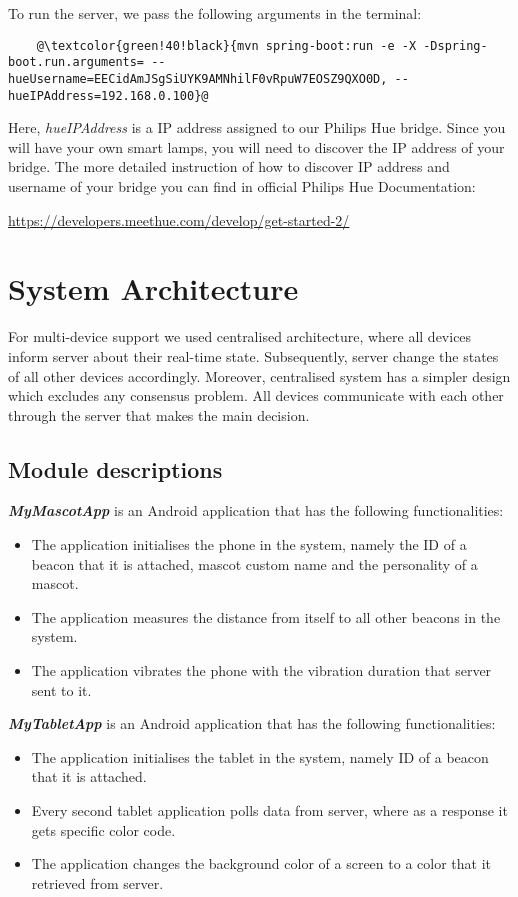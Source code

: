 To run the server, we pass the following arguments in the terminal:
\begin{lstlisting}
    @\textcolor{green!40!black}{mvn spring-boot:run -e -X -Dspring-boot.run.arguments= --hueUsername=EECidAmJSgSiUYK9AMNhilF0vRpuW7EOSZ9QXO0D, --hueIPAddress=192.168.0.100}@
\end{lstlisting}

Here, \emph{hueIPAddress} is a IP address assigned to our Philips Hue bridge.
Since you will have your own smart lamps, you will need to discover the IP address of your bridge.
The more detailed instruction of how to discover IP address and username of your bridge you can
find in official Philips Hue Documentation:

\url{https://developers.meethue.com/develop/get-started-2/}

\section{System Architecture}
\label{sec:system-architecture}
For multi-device support we used centralised architecture, where all devices inform server about their real-time state.
Subsequently, server change the states of all other devices accordingly.
Moreover, centralised system has a simpler design which excludes any consensus problem.
All devices communicate with each other through the server that makes the main decision.

\subsection{Module descriptions}
\label{subsec:module-descriptions}
\textbf{\emph{MyMascotApp}} is an Android application that has the following functionalities:
\begin{itemize}
    \item The application initialises the phone in the system, namely the ID of a beacon that it is attached,
        mascot custom name and the personality of a mascot.
    \item The application measures the distance from itself to all other beacons in the system.
    \item The application vibrates the phone with the vibration duration that server sent to it.
\end{itemize}

\textbf{\emph{MyTabletApp}} is an Android application that has the following functionalities:
\begin{itemize}
    \item The application initialises the tablet in the system, namely ID of a beacon that it is attached.
    \item Every second tablet application polls data from server, where as a response it gets specific color code.
    \item The application changes the background color of a screen to a color that it retrieved from server.
\end{itemize}

